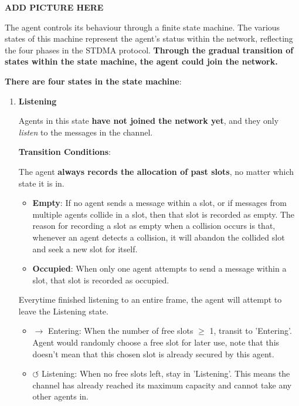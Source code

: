 {\textbf{ADD PICTURE HERE}  %

The agent controls its behaviour through a finite state machine. 
The various states of this machine represent the agent's status within the network, reflecting the four phases in the STDMA protocol.
\textbf{Through the gradual transition of states within the state machine, the agent could join the network.}

\textbf{There are four states in the state machine}:

\begin{enumerate}
    \item \textbf{Listening}
    
    Agents in this state \textbf{have not joined the network yet}, and they only \textit{listen} to the messages in the channel.

    \textbf{Transition Conditions}:
    
    
    The agent \textbf{always records the allocation of past slots}, no matter which state it is in.
    
    \begin{itemize}
        \item \textbf{Empty}: 
        If no agent sends a message within a slot, or if messages from multiple agents collide in a slot, then that slot is recorded as empty. The reason for recording a slot as empty when a collision occurs is that, whenever an agent detects a collision, it will abandon the collided slot and seek a new slot for itself. 
        \item \textbf{Occupied}: 
        When only one agent attempts to send a message within a slot, that slot is recorded as occupied.       
    \end{itemize}

    Everytime finished listening to an entire frame, the agent will attempt to leave the Listening state.
    
    \begin{itemize}
        \item $\rightarrow$ Entering: When the number of free slots $\geq$ 1, transit to 'Entering'. Agent would randomly choose a free slot for later use, note that this doesn't mean that this chosen slot is already secured by this agent.
        \item $\circlearrowleft$ Listening: When no free slots left, stay in 'Listening'. This means the channel has already reached its maximum capacity and cannot take any other agents in. 
    \end{itemize}


\end{enumerate}}
